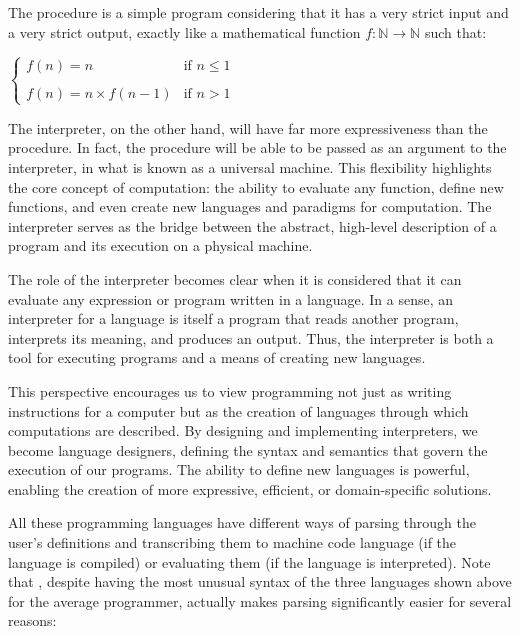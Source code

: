   The  procedure is a simple program considering that it has a very strict input and a very strict output, exactly like a mathematical function $f : \mathbb{N} \to \mathbb{N}$ such that:

  \begin{center}
   $\begin{cases}
      f(n) = n & \text{if } n \leq 1 \\ \\
      f(n) = n \times f(n-1) & \text{if } n > 1
    \end{cases}$
  \end{center}

  The interpreter, on the other hand, will have far more expressiveness than the  procedure. In fact, the  procedure will be able to be passed as an argument to the interpreter, in what is known as a universal machine. This flexibility highlights the core concept of computation: the ability to evaluate any function, define new functions, and even create new languages and paradigms for computation. The interpreter serves as the bridge between the abstract, high-level description of a program and its execution on a physical machine.

  The role of the interpreter becomes clear when it is considered that it can evaluate any expression or program written in a language. In a sense, an interpreter for a language is itself a program that reads another program, interprets its meaning, and produces an output. Thus, the interpreter is both a tool for executing programs and a means of creating new languages.

  This perspective encourages us to view programming not just as writing instructions for a computer but as the creation of languages through which computations are described. By designing and implementing interpreters, we become language designers, defining the syntax and semantics that govern the execution of our programs. The ability to define new languages is powerful, enabling the creation of more expressive, efficient, or domain-specific solutions.

  All these programming languages have different ways of parsing through the user's definitions and transcribing them to machine code language (if the language is compiled) or evaluating them (if the language is interpreted). Note that , despite having the most unusual syntax of the three languages shown above for the average programmer, actually makes parsing significantly easier for several reasons:

